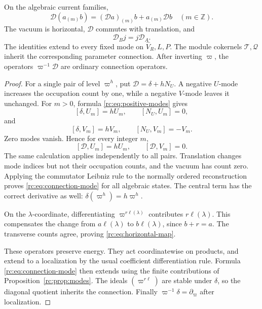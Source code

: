 \begin{theorem}
\label{rc:thm:connection}
On the algebraic current families,
\begin{equation}\label{rc:eq:connection-mode}
 \mathcal D(a_{(m)}b)
       =(\mathcal Da)_{(m)}b+a_{(m)}\mathcal Db
       \quad(m\in\mathbb Z).
\end{equation}
The vacuum is horizontal, \(\mathcal D\) commutes with
translation, and
\begin{equation}\label{rc:eq:horizontal-map}
 \mathcal D_Bj=j\mathcal D_A.
\end{equation}
The identities extend to every fixed mode on
\(\widehat V_R,L,P\).
The module cokernels \(\mathcal T,\mathcal Q\) inherit the
corresponding parameter connection.  After inverting
\(\varpi\), the operators \(\varpi^{-1}\mathcal D\) are
ordinary connection operators.
\end{theorem}
\begin{proof}
For a single pair of level \(\varpi^h\), put
\(\mathcal D=\delta+hN_U\).
A negative \(U\)-mode increases the occupation count by one,
while a negative \(V\)-mode leaves it unchanged.  For \(m>0\),
formula \eqref{rc:eq:positive-modes} gives
\[
 [\delta,U_m]=hU_m,\qquad [N_U,U_m]=0,
\]
and
\[
 [\delta,V_m]=hV_m,\qquad [N_U,V_m]=-V_m.
\]
Zero modes vanish.  Hence for every integer \(m\),
\[
 [\mathcal D,U_m]=hU_m,\qquad
 [\mathcal D,V_m]=0.
\]
The same calculation applies independently to all pairs.
Translation changes mode indices but not their occupation
counts, and the vacuum has count zero.
Applying the commutator Leibniz rule to the normally ordered
reconstruction proves \eqref{rc:eq:connection-mode} for
all algebraic states.  The central term has the correct
derivative as well:
\(\delta(\varpi^h)=h\varpi^h\).

On the \(\lambda\)-coordinate, differentiating
\(\varpi^{r\ell(\lambda)}\) contributes \(r\ell(\lambda)\).
This compensates the change from \(a\ell(\lambda)\) to
\(b\ell(\lambda)\), since \(b+r=a\).
The transverse counts agree, proving
\eqref{rc:eq:horizontal-map}.

These operators preserve energy.  They act coordinatewise
on products, and extend to a localization by the usual
coefficient differentiation rule.  Formula
\eqref{rc:eq:connection-mode} then extends using the finite
contributions of Proposition~\ref{rc:prop:modes}.
The ideals \((\varpi^{r\ell})\) are stable under
\(\delta\), so the diagonal quotient inherits the connection.
Finally \(\varpi^{-1}\delta=\partial_\varpi\) after localization.
\end{proof}

